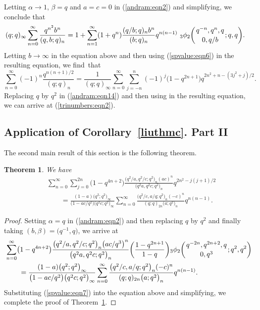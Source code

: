 \documentclass[pdftex]{sigma}
\numberwithin{equation}{section}
\newtheorem{Theorem}{Theorem}[section]
\begin{document}
Letting $\alpha \to 1$, $\beta=q$ and $a=c=0$ in (\ref{andram:eqn2}) and simplifying, we conclude that
\begin{align}\label{andram:eqn14}
&(q; q)_\infty \sum_{n=0}^{\infty} \frac{q^{n^2} b^n}{(q, b; q)_n}
=1+\sum_{n=1}^{\infty}(1+q^n)\frac{(q/b; q)_n b^n}{(b; q)_n} q^{n(n-1)}~{_3\phi_2}\biggl({{q^{-n}, q^n, q}
		\atop{0, q/b}}; q, q\biggr).
\end{align}
Letting $b\to \infty$ in the equation above and then using (\ref{spvalue:eqn6}) in the resulting equation, we find~that%
\begin{equation*}%
\sum_{n=0}^{\infty} (-1)^n \frac{q^{n(n+1)/2}}{(q; q)_n}
=\frac{1}{(q; q)_\infty}\sum_{n=0}^{\infty}\sum_{j=-n}^{n} (-1)^j \bigl(1-q^{2n+1}\bigr) q^{2n^2+n-(3j^2+j)/2}.
\end{equation*}
Replacing $q$ by $q^2$ in (\ref{andram:eqn14}) and then using \cite[equation~(5.33)]{ChenWang2020} in the resulting equation,
we can arrive at (\ref{trinumbers:eqn2}).

\subsection{Application of Corollary~\ref{liuthmc}. Part II}
The second main result of this section is the following theorem.
\begin{Theorem}\label{andrrthm2} We have
\begin{align*}%
&\sum_{n=0}^\infty \sum_{j=0}^{2n} \bigl(1-q^{4n+2}\bigr)\frac{\bigl(q^2/a, q^2/c; q^2\bigr)_n (ac)^n}{\bigl(q^2 a, q^2c; q^2\bigr)_n} q^{2n^2-j(j+1)/2}\\
&\qquad{}=\frac{(1-a)\bigl(q^2; q^2\bigr)_\infty}{\bigl(1-ac/q^2\bigr)\bigl(q^2 c; q^2\bigr)_\infty}
\sum_{n=0}^\infty \frac{\bigl(q^2/c, a/q; q^2\bigr)_n (-c)^n}{(q; q)_{2n} \bigl(a; q^2\bigr)_n}q^{n(n-1)}.\nonumber
\end{align*}
\end{Theorem}
\begin{proof} Setting $\alpha=q$ in (\ref{andram:eqn2}) and then replacing $q$ by $q^2$ and finally taking $(b, \beta)=\bigl(q^{-1}, q\bigr)$, we arrive at
\begin{align*}%
&\sum_{n=0}^\infty \bigl(1-q^{4n+2}\bigr) \frac{\bigl(q^2/a, q^2/c; q^2\bigr)_n \bigl(ac/q^3\bigr)^n}{\bigl(q^2 a, q^2 c; q^2\bigr)_n}
 \biggl(\frac{1-q^{2n+1}}{1-q}\biggr)
{_3\phi_2}\biggl({{q^{-2n}, q^{2n+2}, q} \atop{0, q^3}}; q^2, q^2\biggr)\nonumber\\
&\qquad{}=\frac{(1-a)\bigl(q^2; q^2\bigr)_\infty}{\bigl(1-ac/q^2\bigr)\bigl(q^2 c; q^2\bigr)_\infty}
\sum_{n=0}^\infty \frac{\bigl(q^2/c, a/q; q^2\bigr)_n (-c)^n}{(q; q)_{2n} \bigl(a; q^2\bigr)_n} q^{n(n-1)}.
\end{align*}	
Substituting (\ref{spvalue:eqn7})	into the equation above and simplifying, we complete the proof of Theorem~\ref{andrrthm2}.
\end{proof}
\end{document}
